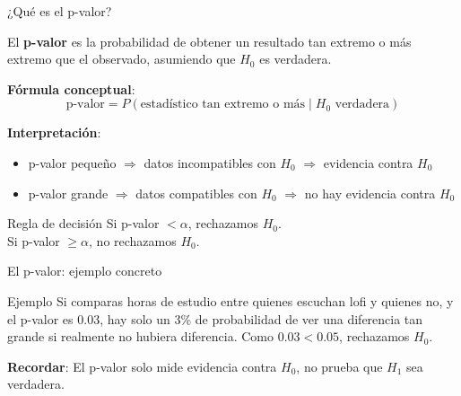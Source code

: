 \documentclass[aspectratio=169, 11pt]{beamer}
\begin{document}
\begin{frame}{¿Qué es el p-valor?}
\begin{definition}[p-valor]
El \textbf{p-valor} es la probabilidad de obtener un resultado tan extremo o más extremo que el observado, \alert{asumiendo que $H_0$ es verdadera}.
\end{definition}

\vspace{0.2cm}
\textbf{Fórmula conceptual}:
\[
\text{p-valor} = P(\text{estadístico tan extremo o más} \mid H_0 \text{ verdadera})
\]

\textbf{Interpretación}:
\begin{itemize}
  \item p-valor \alert{pequeño} $\Rightarrow$ datos incompatibles con $H_0$ $\Rightarrow$ evidencia contra $H_0$
  \item p-valor \alert{grande} $\Rightarrow$ datos compatibles con $H_0$ $\Rightarrow$ no hay evidencia contra $H_0$
\end{itemize}

\begin{block}{Regla de decisión}
Si p-valor $< \alpha$, rechazamos $H_0$.\\
Si p-valor $\geq \alpha$, no rechazamos $H_0$.
\end{block}
\end{frame}

\begin{frame}{El p-valor: ejemplo concreto}
\begin{exampleblock}{Ejemplo}
Si comparas horas de estudio entre quienes escuchan lofi y quienes no, y el p-valor es 0.03, hay solo un 3\% de probabilidad de ver una diferencia tan grande \alert{si realmente no hubiera diferencia}. Como $0.03 < 0.05$, rechazamos $H_0$.
\end{exampleblock}

\vspace{0.3cm}
\textbf{Recordar}: El p-valor solo mide evidencia contra $H_0$, no prueba que $H_1$ sea verdadera.
\end{frame}
\end{document}
